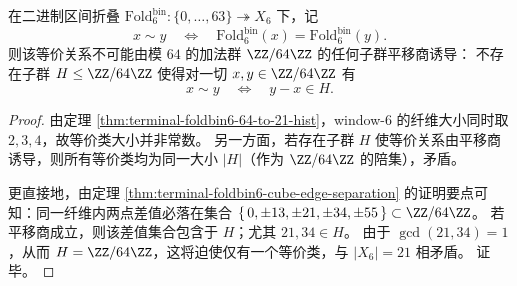 \begin{proposition}\label{prop:window6-no-translation-quotient-fiber}
在二进制区间折叠 \(\mathrm{Fold}^{\mathrm{bin}}_6:\{0,\dots,63\}\twoheadrightarrow X_6\) 下，记
\[
x\sim y\quad\Longleftrightarrow\quad \mathrm{Fold}^{\mathrm{bin}}_6(x)=\mathrm{Fold}^{\mathrm{bin}}_6(y).
\]
则该等价关系不可能由模 \(64\) 的加法群 \(\ZZ/64\ZZ\) 的任何子群平移商诱导：
不存在子群 \(H\le \ZZ/64\ZZ\) 使得对一切 \(x,y\in\ZZ/64\ZZ\) 有
\[
x\sim y\quad\Longleftrightarrow\quad y-x\in H.
\]
\end{proposition}
\begin{proof}
由定理 \ref{thm:terminal-foldbin6-64-to-21-hist}，window-\(6\) 的纤维大小同时取 \(2,3,4\)，故等价类大小并非常数。
另一方面，若存在子群 \(H\) 使等价关系由平移商诱导，则所有等价类均为同一大小 \(|H|\)（作为 \(\ZZ/64\ZZ\) 的陪集），矛盾。
\par
更直接地，由定理 \ref{thm:terminal-foldbin6-cube-edge-separation} 的证明要点可知：同一纤维内两点差值必落在集合
\(
\{\,0,\pm 13,\pm 21,\pm 34,\pm 55\,\}\subset \ZZ/64\ZZ
\)。
若平移商成立，则该差值集合包含于 \(H\)；尤其 \(21,34\in H\)。
由于 \(\gcd(21,34)=1\)，从而 \(H=\ZZ/64\ZZ\)，这将迫使仅有一个等价类，与 \(|X_6|=21\) 相矛盾。
证毕。
\end{proof}
